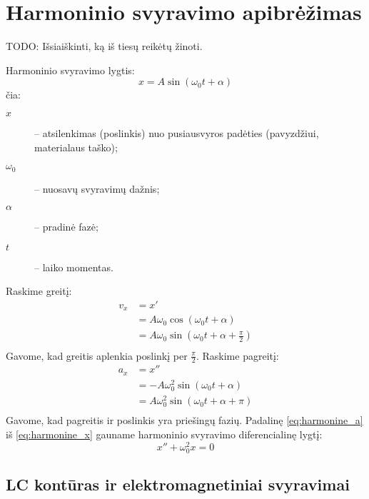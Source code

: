 \section{Harmoninio svyravimo apibrėžimas}

TODO: Išsiaiškinti, ką iš tiesų reikėtų žinoti.

Harmoninio svyravimo lygtis:
\begin{equation}
  x = A \sin \left( \omega_{0}t + \alpha \right)
  \label{eq:harmonine_x}
\end{equation}
čia:
\begin{description}
  \item[$x$] – atsilenkimas (poslinkis) nuo pusiausvyros padėties
    (pavyzdžiui, materialaus taško);
  \item[$\omega_{0}$] – nuosavų svyravimų dažnis;
  \item[$\alpha$] – pradinė fazė;
  \item[$t$] – laiko momentas.
\end{description}

Raskime greitį:
\begin{align*}
  v_{x}
    &= x' \\
    &= A \omega_{0} \cos \left( \omega_{0}t + \alpha \right) \\
    &= A \omega_{0}
        \sin \left( \omega_{0}t + \alpha + \frac{\pi}{2} \right) \\
\end{align*}
Gavome, kad greitis aplenkia poslinkį per $\frac{\pi}{2}$. Raskime
pagreitį:
\begin{align}
  a_{x}
    &= x'' \\
    &= -A \omega_{0}^{2} \sin \left( \omega_{0}t + \alpha \right) \\
    &= A \omega_{0}^{2} \sin \left( \omega_{0}t + \alpha + \pi \right) 
  \label{eq:harmonine_a} \\
\end{align}
Gavome, kad pagreitis ir poslinkis yra priešingų fazių. Padalinę
\ref{eq:harmonine_a} iš \ref{eq:harmonine_x} gauname harmoninio svyravimo
diferencialinę lygtį:
\begin{equation*}
  x'' + \omega_{0}^{2}x = 0
\end{equation*}

\subsection{LC kontūras ir elektromagnetiniai svyravimai}

